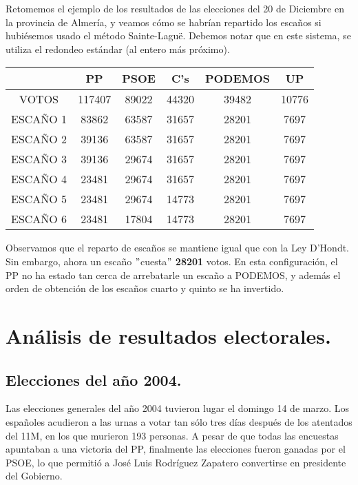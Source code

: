 \documentclass[11pt]{article}
\newcommand\console[1]{{\inconsolata #1}}
\begin{document}
Retomemos el ejemplo de los resultados de las elecciones del 20 de Diciembre en la provincia de Almería, y veamos cómo se habrían repartido los escaños si hubiésemos usado el método Sainte-Laguë. Debemos notar que en este sistema, se utiliza el redondeo estándar (al entero más próximo).\\
\console{
\begin{center}
\begin{tabular}{|c|c|c|c|c|c|}
	\hline
	 & PP & PSOE & C's & PODEMOS & UP \\
	\hline
	VOTOS & 117407 & 89022 & 44320 & 39482 & 10776 \\
	\hline
	ESCAÑO 1 &\cellcolor{gray!25} 83862 & 63587 & 31657 & 28201 & 7697 \\
	\hline
	ESCAÑO 2 & 39136 &\cellcolor{gray!25} 63587 & 31657 & 28201 & 7697 \\
	\hline
	ESCAÑO 3 &\cellcolor{gray!25} 39136 & 29674 & 31657 & 28201 & 7697 \\
	\hline
	ESCAÑO 4 & 23481 & 29674 &\cellcolor{gray!25} 31657 & 28201 & 7697 \\
	\hline
	ESCAÑO 5 & 23481 &\cellcolor{gray!25} 29674 & 14773 & 28201 & 7697 \\
	\hline
	ESCAÑO 6 & 23481 & 17804 & 14773 &\cellcolor{gray!25} 28201 & 7697 \\
	\hline 
\end{tabular}
\end{center}
}

\vspace{0.5em}
Observamos que el reparto de escaños se mantiene igual que con la Ley D'Hondt. Sin embargo, ahora un escaño $"$cuesta$"$\hspace{0.2em} \textbf{28201}  votos. En esta configuración, el PP no ha estado tan cerca de arrebatarle un escaño a PODEMOS, y además el orden de obtención de los escaños cuarto y quinto se ha invertido.
	
	\newpage
	
	\section{Análisis de resultados electorales.}
	\subsection{Elecciones del año 2004.}
	
	Las elecciones generales del año 2004 tuvieron lugar el domingo 14 de marzo. Los españoles acudieron a las urnas a votar tan sólo tres días después de los atentados del 11M, en los que murieron 193 personas. A pesar de que todas las encuestas apuntaban a una victoria del PP, finalmente las elecciones fueron ganadas por el PSOE, lo que permitió a José Luis Rodríguez Zapatero convertirse en presidente del Gobierno.
	
\end{document}

